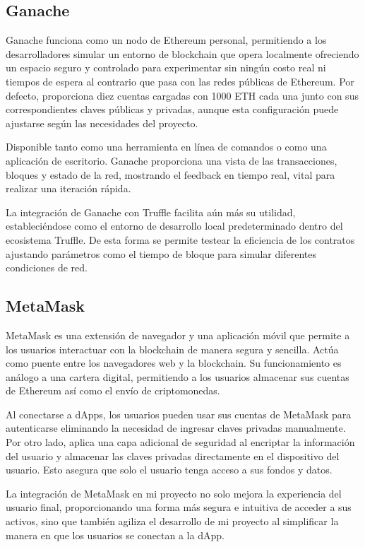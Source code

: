 \subsection{Ganache}

Ganache funciona como un nodo de Ethereum personal, permitiendo a los desarrolladores simular un entorno de blockchain que opera localmente ofreciendo un espacio seguro y controlado para experimentar sin ningún costo real ni tiempos de espera al contrario que pasa con las redes públicas de Ethereum.
Por defecto, proporciona diez cuentas cargadas con 1000 ETH cada una junto con sus correspondientes claves públicas y privadas, aunque esta configuración puede ajustarse según las necesidades del proyecto.

Disponible tanto como una herramienta en línea de comandos o como una aplicación de escritorio. Ganache proporciona  una vista de las transacciones, bloques y estado de la red, mostrando el feedback en tiempo real, vital para realizar una iteración rápida.

La integración de Ganache con Truffle facilita aún más su utilidad, estableciéndose como el entorno de desarrollo local predeterminado dentro del ecosistema Truffle.
De esta forma se permite testear la eficiencia de los contratos ajustando parámetros como el tiempo de bloque para simular diferentes condiciones de red.


\subsection{MetaMask}

MetaMask es una extensión de navegador y una aplicación móvil que permite a los usuarios interactuar con la blockchain de manera segura y sencilla. Actúa como puente entre los navegadores web y la blockchain.
Su funcionamiento es análogo a una cartera digital, permitiendo a los usuarios almacenar sus cuentas de Ethereum así como el envío de criptomonedas.

Al conectarse a dApps, los usuarios pueden usar sus cuentas de MetaMask para autenticarse eliminando la necesidad de ingresar claves privadas manualmente. Por otro lado, aplica una capa adicional de seguridad al encriptar la información del usuario y almacenar las claves privadas directamente en el dispositivo del usuario. Esto asegura que solo el usuario tenga acceso a sus fondos y datos.

La integración de MetaMask en mi proyecto no solo mejora la experiencia del usuario final,
proporcionando una forma más segura e intuitiva de acceder a sus activos, sino que también agiliza el desarrollo de mi proyecto al simplificar la manera en que los usuarios se conectan a la dApp.

